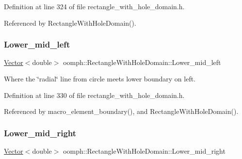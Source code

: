 Definition at line 324 of file rectangle\+\_\+with\+\_\+hole\+\_\+domain.\+h.



Referenced by Rectangle\+With\+Hole\+Domain().

\mbox{\label{classoomph_1_1RectangleWithHoleDomain_aa643600f8269e6037a76832dd0fba0f9}} 
\subsubsection{\texorpdfstring{Lower\+\_\+mid\+\_\+left}{Lower\_mid\_left}}
{\footnotesize\ttfamily \hyperlink{classoomph_1_1Vector}{Vector}$<$double$>$ oomph\+::\+Rectangle\+With\+Hole\+Domain\+::\+Lower\+\_\+mid\+\_\+left\hspace{0.3cm}{\ttfamily [private]}}



Where the \char`\"{}radial\char`\"{} line from circle meets lower boundary on left. 



Definition at line 330 of file rectangle\+\_\+with\+\_\+hole\+\_\+domain.\+h.



Referenced by macro\+\_\+element\+\_\+boundary(), and Rectangle\+With\+Hole\+Domain().

\mbox{\label{classoomph_1_1RectangleWithHoleDomain_a9ef86489e71e2f67eec783b460694be2}} 
\subsubsection{\texorpdfstring{Lower\+\_\+mid\+\_\+right}{Lower\_mid\_right}}
{\footnotesize\ttfamily \hyperlink{classoomph_1_1Vector}{Vector}$<$double$>$ oomph\+::\+Rectangle\+With\+Hole\+Domain\+::\+Lower\+\_\+mid\+\_\+right\hspace{0.3cm}{\ttfamily [private]}}



